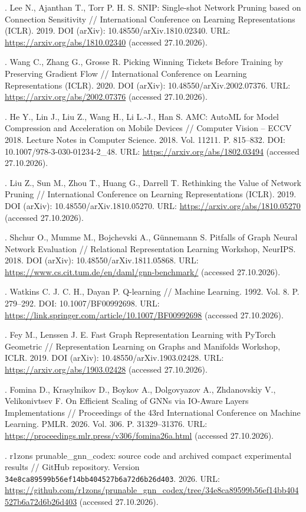 \documentclass[10pt,a4paper]{article}
\begin{document}
. Lee N., Ajanthan T., Torr P. H. S. SNIP: Single-shot Network Pruning based on Connection Sensitivity // International Conference on Learning Representations (ICLR). 2019. DOI (arXiv): 10.48550/arXiv.1810.02340. URL: \url{https://arxiv.org/abs/1810.02340} (accessed 27.10.2026).\par
{}. Wang C., Zhang G., Grosse R. Picking Winning Tickets Before Training by Preserving Gradient Flow // International Conference on Learning Representations (ICLR). 2020. DOI (arXiv): 10.48550/arXiv.2002.07376. URL: \url{https://arxiv.org/abs/2002.07376} (accessed 27.10.2026).\par
{}. He Y., Lin J., Liu Z., Wang H., Li L.-J., Han S. AMC: AutoML for Model Compression and Acceleration on Mobile Devices // Computer Vision – ECCV 2018. Lecture Notes in Computer Science. 2018. Vol. 11211. P. 815–832. DOI: 10.1007/978-3-030-01234-2\_48. URL: \url{https://arxiv.org/abs/1802.03494} (accessed 27.10.2026).\par
{}. Liu Z., Sun M., Zhou T., Huang G., Darrell T. Rethinking the Value of Network Pruning // International Conference on Learning Representations (ICLR). 2019. DOI (arXiv): 10.48550/arXiv.1810.05270. URL: \url{https://arxiv.org/abs/1810.05270} (accessed 27.10.2026).\par
{}. Shchur O., Mumme M., Bojchevski A., Günnemann S. Pitfalls of Graph Neural Network Evaluation // Relational Representation Learning Workshop, NeurIPS. 2018. DOI (arXiv): 10.48550/arXiv.1811.05868. URL: \url{https://www.cs.cit.tum.de/en/daml/gnn-benchmark/} (accessed 27.10.2026).\par
{}. Watkins C. J. C. H., Dayan P. Q-learning // Machine Learning. 1992. Vol. 8. P. 279–292. DOI: 10.1007/BF00992698. URL: \url{https://link.springer.com/article/10.1007/BF00992698} (accessed 27.10.2026).\par
{}. Fey M., Lenssen J. E. Fast Graph Representation Learning with PyTorch Geometric // Representation Learning on Graphs and Manifolds Workshop, ICLR. 2019. DOI (arXiv): 10.48550/arXiv.1903.02428. URL: \url{https://arxiv.org/abs/1903.02428} (accessed 27.10.2026).\par
{}. Fomina D., Krasylnikov D., Boykov A., Dolgovyazov A., Zhdanovskiy V., Velikonivtsev F. On Efficient Scaling of GNNs via IO-Aware Layers Implementations // Proceedings of the 43rd International Conference on Machine Learning. PMLR. 2026. Vol. 306. P. 31329–31376. URL: \url{https://proceedings.mlr.press/v306/fomina26a.html} (accessed 27.10.2026).\par
{}. r1zons prunable\_gnn\_codex: source code and archived compact experimental results // GitHub repository. Version \texttt{34e8ca89\allowbreak 599b56ef\allowbreak 14bb4045\allowbreak 27b6a72d\allowbreak 6b26d403}. 2026. URL: \url{https://github.com/r1zons/prunable_gnn_codex/tree/34e8ca89599b56ef14bb404527b6a72d6b26d403} (accessed 27.10.2026).\par
\end{document}
